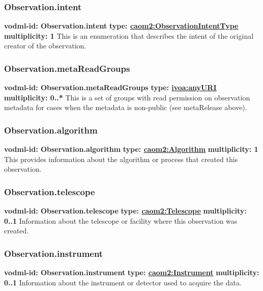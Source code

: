     \subsubsection{Observation.intent}
      \textbf{vodml-id: Observation.intent} \newline
      \textbf{type: \hyperref[sect:ObservationIntentType]{caom2:ObservationIntentType}} \newline
      \textbf{multiplicity: 1} \newline
      This is an enumeration that describes the intent of the original creator of the observation.

    \subsubsection{Observation.metaReadGroups}
      \textbf{vodml-id: Observation.metaReadGroups} \newline
      \textbf{type: \hyperref[sect:ivoa]{ivoa:anyURI}} \newline
      \textbf{multiplicity: 0..*} \newline
      This is a set of groups with read permission on observation metadata for cases when the metadata is non-public (see metaRelease above).

    \subsubsection{Observation.algorithm}
      \textbf{vodml-id: Observation.algorithm} \newline
      \textbf{type: \hyperref[sect:Algorithm]{caom2:Algorithm}} \newline
      \textbf{multiplicity: 1} \newline
      This provides information about the algorithm or process that created this observation.

    \subsubsection{Observation.telescope}
      \textbf{vodml-id: Observation.telescope} \newline
      \textbf{type: \hyperref[sect:Telescope]{caom2:Telescope}} \newline
      \textbf{multiplicity: 0..1} \newline
      Information about the telescope or facility where this observation was created.

    \subsubsection{Observation.instrument}
      \textbf{vodml-id: Observation.instrument} \newline
      \textbf{type: \hyperref[sect:Instrument]{caom2:Instrument}} \newline
      \textbf{multiplicity: 0..1} \newline
      Information about the instrument or detector used to acquire the data.

